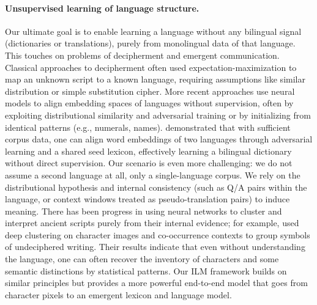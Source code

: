 \documentclass[10pt,twocolumn]{article}
\begin{document}
\paragraph{Unsupervised learning of language structure.} Our ultimate goal is to enable learning a language without any bilingual signal (dictionaries or translations), purely from monolingual data of that language. This touches on problems of decipherment and emergent communication. Classical approaches to decipherment often used expectation-maximization to map an unknown script to a known language, requiring assumptions like similar distribution or simple substitution cipher. More recent approaches use neural models to align embedding spaces of languages without supervision, often by exploiting distributional similarity and adversarial training \citep{conneau2018word} or by initializing from identical patterns (e.g., numerals, names). \citep{conneau2018word} demonstrated that with sufficient corpus data, one can align word embeddings of two languages through adversarial learning and a shared seed lexicon, effectively learning a bilingual dictionary without direct supervision. Our scenario is even more challenging: we do not assume a second language at all, only a single-language corpus. We rely on the distributional hypothesis and internal consistency (such as Q/A pairs within the language, or context windows treated as pseudo-translation pairs) to induce meaning. There has been progress in using neural networks to cluster and interpret ancient scripts purely from their internal evidence; for example, \citep{born2023clustering} used deep clustering on character images and co-occurrence contexts to group symbols of undeciphered writing. Their results indicate that even without understanding the language, one can often recover the inventory of characters and some semantic distinctions by statistical patterns. Our ILM framework builds on similar principles but provides a more powerful end-to-end model that goes from character pixels to an emergent lexicon and language model.
\end{document}
